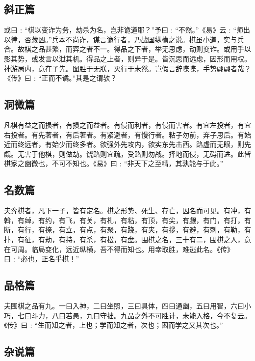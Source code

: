 \documentclass[]{article}
\begin{document}
\hypertarget{header-n179}{%
\subsection{斜正篇}\label{header-n179}}

或曰﹕``棋以变诈为务，劫杀为名，岂非诡道耶？''予曰﹕``不然。''《易》云﹕``师出以律，否藏凶。''兵本不尚诈，谋言诡行者，乃战国纵横之说。棋虽小道，实与兵合。故棋之品甚繁，而弈之者不一。得品之下者，举无思虑，动则变诈。或用手以影其势，或发言以泄其机。得品之上者，则异于是。皆沉思而远虑，因形而用权。神游局内，意在子先。图胜于无朕，灭行于未然。岂假言辞喋喋，手势翩翩者哉？《传》曰﹕``正而不谲。''其是之谓欤？

\hypertarget{header-n183}{%
\subsection{洞微篇}\label{header-n183}}

凡棋有益之而损者，有损之而益者。有侵而利者，有侵而害者。有宜左投者，有宜右投者。有先著者，有后著者。有紧避者，有慢行者。粘子勿前，弃子思后。有始近而终远者，有始少而终多者。欲强外先攻内，欲实东先击西。路虚而无眼，则先觑。无害于他棋，则做劫。饶路则宜疏，受路则勿战。择地而侵，无碍而进。此皆棋家之幽微也，不可不知也。《易》曰﹕``非天下之至精，其孰能与于此。''

\hypertarget{header-n187}{%
\subsection{名数篇}\label{header-n187}}

夫弈棋者，凡下一子，皆有定名。棋之形势、死生、存亡，因名而可见。有冲，有斡，有绰，有约，有飞，有关，有札，有粘，有顶，有尖，有觑，有门，有打，有断，有行，有捺，有立，有点，有聚，有跷，有夹，有拶，有避，有刺，有勒，有扑，有征，有劫，有持，有杀，有松，有盘。围棋之名，三十有二，围棋之人，意在可周。临局变化，远近纵横，吾不得而知也。用幸取胜，难逃此名。《传》曰﹕``必也，正名乎棋！''

\hypertarget{header-n191}{%
\subsection{品格篇}\label{header-n191}}

夫围棋之品有九。一曰入神，二曰坐照，三曰具体，四曰通幽，五曰用智，六曰小巧，七曰斗力，八曰若愚，九曰守拙。九品之外不可胜计，未能入格，今不复云。《传》曰﹕``生而知之者，上也；学而知之者，次也；困而学之又其次也。''

\hypertarget{header-n195}{%
\subsection{杂说篇}\label{header-n195}}
\end{document}
